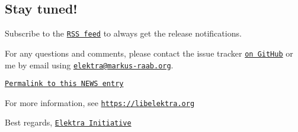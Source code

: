 \subsection*{Stay tuned!}

Subscribe to the \href{https://www.libelektra.org/news/feed.rss}{\tt R\+SS feed} to always get the release notifications.

For any questions and comments, please contact the issue tracker \href{http://issues.libelektra.org}{\tt on Git\+Hub} or me by email using \href{mailto:elektra@markus-raab.org}{\tt elektra@markus-\/raab.\+org}.

\href{https://www.libelektra.org/news/0.8.22-release}{\tt Permalink to this N\+E\+WS entry}

For more information, see \href{https://libelektra.org}{\tt https\+://libelektra.\+org}

Best regards, \href{https://www.libelektra.org/developers/authors}{\tt Elektra Initiative} 